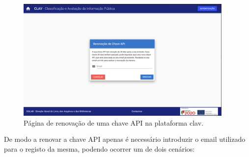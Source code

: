 \begin{figure}[H]
    \centering
    \includegraphics[width=0.95\textwidth]{img/clav/authAPI/renovar.png}
    \caption{Página de renovação de uma chave API na plataforma \gls{clav}.}
    \label{fig:renovarChaveAPI}
\end{figure}

De modo a renovar a chave API apenas é necessário introduzir o email utilizado para o registo da mesma, podendo ocorrer um de dois cenários:


